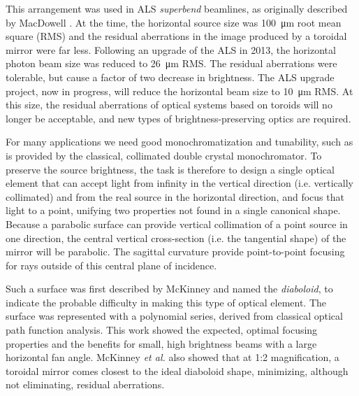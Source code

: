 \documentclass[preprint]{iucr}       %
\newcommand{\inred}[1]{{\color{red}#1}}
\begin{document}
This arrangement was used in ALS \emph{superbend} beamlines, as originally described by MacDowell \cite{MacDowell2004}. At the time, the horizontal source size was \SI{100}{\micro\meter} root mean square (RMS) and the residual aberrations in the image produced by a toroidal mirror were far less. Following an upgrade of the ALS in 2013, the horizontal photon beam size was reduced \cite{Steier_2014} to \SI{26}{\micro\meter} RMS. The residual aberrations were tolerable, but cause a factor of two decrease in brightness. The ALS upgrade project, now in progress, will reduce the horizontal beam size to
\SI{10}{\micro\meter} RMS. At this size, the residual aberrations of optical systems based on toroids will no longer be acceptable, and new types of brightness-preserving optics are required.

For many applications we need good monochromatization and tunability, such as is provided by the classical, collimated double crystal monochromator. To preserve the source brightness, the task is therefore to design a single optical element that can accept light from infinity in the vertical direction (i.e. vertically collimated) and from the real source in the horizontal direction, and focus that light to a point, unifying two properties not found in a single canonical shape.
Because a parabolic surface can provide vertical collimation of a point source in one direction, the central vertical cross-section (i.e. the tangential shape) of the mirror will be parabolic. The sagittal curvature provide point-to-point focusing for rays outside of this central plane of incidence.

Such a surface was first described by McKinney \cite{McKinneySPIE2009} and named the \emph{diaboloid}, to indicate the probable difficulty in making this type of optical element. The surface was represented with a polynomial series, derived from classical optical path function analysis. This work showed the expected, optimal focusing properties and the benefits for small, high brightness beams with a large horizontal fan angle. McKinney {\it et al.} also showed that at 1:2 magnification, a toroidal mirror comes closest to the ideal diaboloid shape, minimizing, although not eliminating, residual aberrations.
\end{document}
